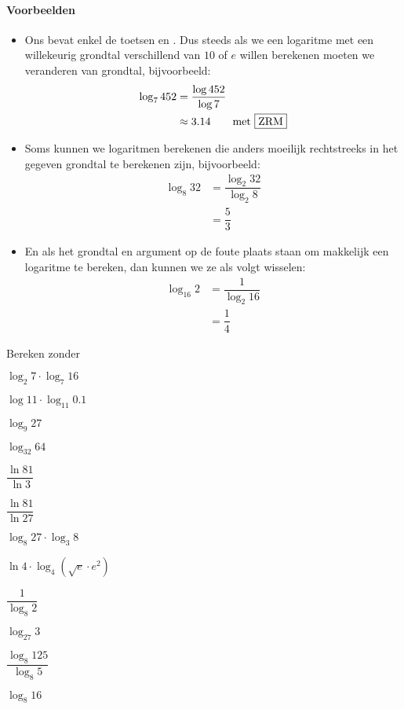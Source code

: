 \documentclass[12pt,twoside,a4paper]{article}
\begin{document}
\paragraph*{Voorbeelden}
\begin{itemize}
  \item Ons  bevat enkel de toetsen  en . Dus steeds als we een logaritme met een willekeurig grondtal verschillend van $10$ of $e$ willen berekenen moeten we veranderen van grondtal, bijvoorbeeld:
  \begin{align*}
    \log_{7}452 &= \dfrac{\log 452}{\log 7}\\
                &\approx 3.14 \qquad\mbox{met \zrm{ZRM}}
  \end{align*}
  \item Soms kunnen we logaritmen berekenen die anders moeilijk rechtstreeks in het gegeven grondtal te berekenen zijn, bijvoorbeeld:
  \begin{align*}
    \log_{8}32 &= \dfrac{\log_2 32}{\log_2 8}\\
               &= \dfrac{5}{3}
  \end{align*}
  \item En als het grondtal en argument op de foute plaats staan om makkelijk een logaritme te bereken, dan kunnen we ze als volgt wisselen:
  \begin{align*}
    \log_{16}2 &= \dfrac{1}{\log_2 16}\\
               &= \dfrac{1}{4}
  \end{align*}
\end{itemize}

\begin{oefening} %
Bereken zonder 
\begin{exlist}{2}
  \item $\log_2 7 \cdot \log_7 16$
  \item $\log 11 \cdot \log_{11} 0.1$
  \item $\log_9 27$
  \item $\log_{32} 64$
  \item $\dfrac{\ln 81}{\ln 3}$
  \item $\dfrac{\ln 81}{\ln 27}$
  \item $\log_8 27 \cdot \log_3 8$
  \item $\ln 4 \cdot \log_4 (\sqrt{e}\cdot e^2)$
  \item $\dfrac{1}{\log_8 2}$
  \item $\log_27 3$
  \item $\dfrac{\log_8 125}{\log_8 5}$
  \item $\log_8 16$
\end{exlist}
\end{oefening}
\end{document}
